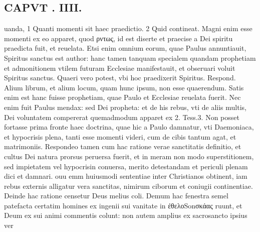 \documentclass{article}
\begin{document}
\begin{pages}
\section*{CAPVT . IIII. }
\marginpar{[ p.181 ]}\pstart uanda, 1 Quanti momenti sit haec praedictio. 2 Quid contineat. Magni enim esse momenti ex eo apparet, quod ρντως, id est diserte et praecise a Dei spiritu praedicta fuit, et reuelata. Etsi enim omnium eorum, quae Paulus annuntiauit, Spiritus sanctus est author: hanc tamen tanquam specialem quandam prophetiam et admonitionem vtilem futuram Ecclesiae manifestauit, et obseruari voluit Spiritus sanctus. Quaeri vero potest, vbi hoc praedixerit Spiritus. Respond. Alium librum, et alium locum, quam hunc ipsum, non esse quaerendum. Satis enim est hanc fuisse prophetiam, quae Paulo et Ecclesiae reuelata fuerit. Nec enim fuit Paulus mendax: sed Dei propheta: et de his rebus, vti de aliis multis, Dei voluntatem compererat quemadmodum apparet ex 2. Tess.3. Non posset fortasse prima fronte haec doctrina, quae hic a Paulo damnatur, vti Daemoniaca, et hypocrisis plena, tanti esse momenti videri, cum de cibis tantum agat, et matrimoniis. Respondeo tamen cum hac ratione verae sanctitatis definitio, et cultus Dei natura prorsus peruersa fuerit, et in meram non modo superstitionem, sed impietatem vel hypocrisin conuersa, merito detestandam et periculi plenam dici et damnari. ouu emm huiusmodi sententiae inter Christianos obtinent, iam rebus externis alligatur vera sanctitas, nimirum ciborum et coniugii continentiae. Deinde hac ratione censetur Deus melius coli. Demum hac fenestra semel patefacta certatim homines ex ingenii sui vanitate in ἐθελοSonσκάας ruunt, et Deum ex sui animi commentis colunt: non autem amplius ex sacrosancto ipsius ver\pend

\end{pages}
\end{document}
